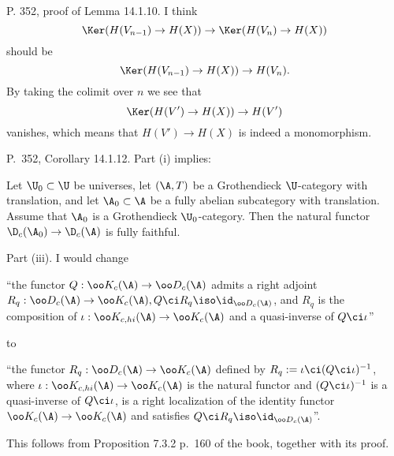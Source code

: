 \documentclass[12pt]{article}
\theoremstyle{remark}
\theoremstyle{definition}
\begin{document}
%

\begin{s}
P. 352, proof of Lemma 14.1.10. I think 
$$
\Ker(H(V_{n-1})\to H(X))\to\Ker(H(V_n)\to H(X))
$$ 
should be 
$$
\Ker(H(V_{n-1})\to H(X))\to H(V_n).
$$ 
By taking the colimit over $n$ we see that 
$$
\Ker(H(V')\to H(X))\to H(V')
$$ 
vanishes, which means that $H(V')\to H(X)$ is indeed a monomorphism.
\end{s}

%

\begin{s}
P.~352, Corollary 14.1.12. Part (i) implies:%

Let $\U_0\subset\U$ be universes, let $(\A,T)$ be a Grothendieck $\U$-category with translation, and let $\A_0\subset\A$ be a fully abelian subcategory with translation. Assume that $\A_0$ is a Grothendieck $\U_0$-category. Then the natural functor $\D_c(\A_0)\to\D_c(\A)$ is fully faithful.%

\nn Part (iii). %
I would change 

\nn``the functor $Q:\oo K_c(\A)\to\oo D_c(\A)$ admits a right adjoint $R_q:\oo D_c(\A)\to\oo K_c(\A), Q\ci R_q\iso\id_{\oo D_c(\A)}$, and $R_q$ is the composition of $\iota:\oo K_{c,hi}(\A)\to\oo K_c(\A)$ and a quasi-inverse of $Q\ci\iota$''

\nn to

\nn``the functor $R_q:\oo D_c(\A)\to\oo K_c(\A)$ defined by $R_q:=\iota\ci(Q\ci\iota)^{-1}$, where $\iota:\oo K_{c,hi}(\A)\to\oo K_c(\A)$ is the natural functor and $(Q\ci\iota)^{-1}$ is a quasi-inverse of $Q\ci\iota$, is a right localization of the identity functor $\oo K_c(\A)\to\oo K_c(\A)$ and satisfies $Q\ci R_q\iso\id_{\oo D_c(\A)}$''.

This follows from Proposition 7.3.2 p.~160 of the book, together with its proof.
\end{s}


\end{document}
